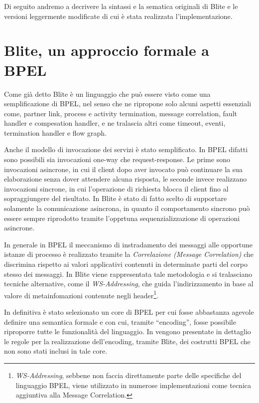 Di seguito andremo a decrivere la sintassi e  la sematica originali di Blite e
le versioni leggermente modificate di cui è stata realizzata l'implementazione.

\section{Blite, un approccio formale a BPEL}

Come già detto Blite è un linguaggio che può essere visto come una
semplificazione di BPEL, nel senso che ne ripropone solo alcuni aspetti
essenziali come, partner link, process e activity termination, message
correlation, fault handler e compesation handler, e ne tralascia altri come
timeout, eventi, termination handler e flow graph.

Anche il modello di invocazione dei servizi è stato semplificato. In BPEL difatti
sono possibili sia invocazioni one-way che request-response. Le prime sono
invocazioni asincrone, in cui il client dopo aver invocato può continuare la sua
elaborazione senza dover attendere alcuna risposta, le seconde invece realizzano
invocazioni sincrone, in cui l'operazione di richiesta blocca il client fino al
sopraggiungere del risultato. In Blite è stato di fatto scelto di supportare
solamente la comunicazione asincrona, in quanto il comportamento sincrono può
essere sempre riprodotto tramite l'opprtuna sequenzializzazione di operazioni
asincrone.

In generale in BPEL il meccanismo di instradamento dei messaggi alle opportune
istanze di processo è realizzato tramite la \emph{Correlazione (Message
Correlation)} che discrimina rispetto ai valori applicativi contenuti in determinate parti del
corpo stesso dei messaggi. In Blite viene rappresentata tale metodologia e si
tralasciano tecniche alternative, come il \emph{WS-Addressing}, che guida
l'indirizzamento in base al valore di metainfomazioni contenute negli
header\footnote{\emph{WS-Addressing}, sebbene non faccia direttamente parte
delle specifiche del linguaggio BPEL, viene utilizzato in numerose
implementazioni come tecnica aggiuntiva alla Message
Correlation.}.

In definitiva è stato selezionato un core di BPEL per cui fosse abbastanza
agevole definire una semantica formale e con cui, tramite ``encoding'', fosse
possibile riproporre tutte le funzionalità del linguaggio. In \cite{LaPuTie1}
vengono presentate in dettaglio le regole per la realizzazione dell'encoding,
tramite Blite, dei costrutti BPEL che non sono stati inclusi in tale core. 

